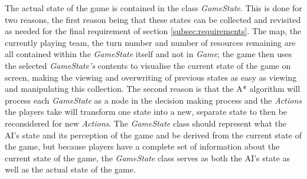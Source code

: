 \documentclass[11pt, a4paper]{report}
\begin{document}
The actual state of the game is contained in the class \emph{GameState}. This is done for two reasons, the first reason being that these states can be collected and revisited as needed for the final requirement of section \ref{subsec:requirements}. The map, the currently playing team, the turn number and number of resources remaining are all contained within the \emph{GameState} itself and not in \emph{Game}; the game then uses the selected \emph{GameState's} contents to visualise the current state of the game on screen, making the viewing and overwriting of previous states as easy as viewing and manipulating this collection. The second reason is that the A* algorithm will process each \emph{GameState} as a node in the decision making process and the \emph{Actions} the players take will transform one state into a new, separate state to then be reconsidered for new \emph{Actions}. The \emph{GameState} class should represent what the AI's state and its perception of the game and be derived from the current state of the game, but because players have a complete set of information about the current state of the game, the \emph{GameState} class serves as both the AI's state as well as the actual state of the game.
\end{document}
